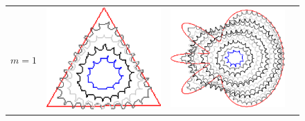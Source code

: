 {\begin{figure}
\center
\begin{tabular}{p{3em}ccc}
$m=1$ & \includegraphics[scale=0.25]{figures/chapter6/level-effect/triangle/improve/len_pen0/radius-9/level1/summary.pdf} &
\includegraphics[scale=0.25]{figures/chapter6/level-effect/flower/improve/len_pen0/radius-9/level1/summary.pdf} &

\end{tabular}
\end{figure}}
